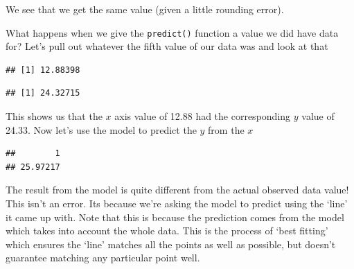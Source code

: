 \documentclass[
]{book}
\newenvironment{Shaded}{\begin{snugshade}}{\end{snugshade}}
\newcommand{\DataTypeTok}[1]{\textcolor[rgb]{0.13,0.29,0.53}{#1}}
\newcommand{\DecValTok}[1]{\textcolor[rgb]{0.00,0.00,0.81}{#1}}
\newcommand{\KeywordTok}[1]{\textcolor[rgb]{0.13,0.29,0.53}{\textbf{#1}}}
\newcommand{\NormalTok}[1]{#1}
\newcommand{\OperatorTok}[1]{\textcolor[rgb]{0.81,0.36,0.00}{\textbf{#1}}}
\newcommand{\StringTok}[1]{\textcolor[rgb]{0.31,0.60,0.02}{#1}}
\begin{document}
We see that we get the same value (given a little rounding error).

What happens when we give the \texttt{predict()} function a value we did have data for? Let's pull out whatever the fifth value of our data was and look at that

\begin{Shaded}
\end{Shaded}

\begin{verbatim}
## [1] 12.88398
\end{verbatim}

\begin{Shaded}
\end{Shaded}

\begin{verbatim}
## [1] 24.32715
\end{verbatim}

This shows us that the \(x\) axis value of 12.88 had the corresponding \(y\) value of 24.33. Now let's use the model to predict the \(y\) from the \(x\)

\begin{Shaded}
\end{Shaded}

\begin{verbatim}
##        1 
## 25.97217
\end{verbatim}

The result from the model is quite different from the actual observed data value! This isn't an error. Its because we're asking the model to predict using the `line' it came up with. Note that this is because the prediction comes from the model which takes into account the whole data. This is the process of `best fitting' which ensures the `line' matches all the points as well as possible, but doesn't guarantee matching any particular point well.
\end{document}
